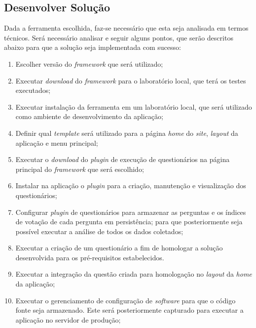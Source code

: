 %
\subsection{Desenvolver Solução}
\label{sub:definir_tecnologia}

Dada a ferramenta escolhida, faz-se necessário que esta seja analisada em termos técnicos. Será necessário analisar e seguir alguns pontos, que
serão descritos abaixo para que a solução seja implementada com sucesso:

\begin{enumerate}
    \item Escolher versão do \textit{framework} que será utilizado;
    \item Executar \textit{download} do \textit{framework} para o laboratório local, que terá os testes executados;
    \item Executar instalação da ferramenta em um laboratório local, que será utilizado como ambiente de
        desenvolvimento da aplicação;
    \item Definir qual \textit{template} será utilizado para a página \textit{home} do \textit{site}, \textit{layout} da aplicação e menu principal;
    \item Executar o \textit{download} do \textit{plugin} de execução de questionários na página principal do \textit{framework} que será escolhido;
    \item Instalar na aplicação o \textit{plugin} para a criação, manutenção e visualização dos questionários;
    \item Configurar \textit{plugin} de questionários para armazenar as perguntas e os índices de votação de cada pergunta em persistência;
        para que posteriormente seja possível executar a análise de todos os dados coletados;
    \item Executar a criação de um questionário a fim de homologar a solução desenvolvida para os pré-requisitos estabelecidos. 
    \item Executar a integração da questão criada para homologação no \textit{layout} da \textit{home} da aplicação;
    \item Executar o gerenciamento de configuração de \textit{software} para que o código fonte seja armazenado. Este será posteriormente
        capturado para executar a aplicação no servidor de produção;
\end{enumerate}

